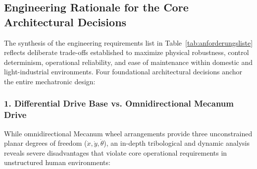 \subsection{Engineering Rationale for the Core Architectural Decisions}
\label{subsec:engineering_rationale}
The synthesis of the engineering requirements list in Table~\ref{tab:anforderungsliste} reflects deliberate trade-offs established to maximize physical robustness, control determinism, operational reliability, and ease of maintenance within domestic and light-industrial environments. Four foundational architectural decisions anchor the entire mechatronic design:

\subsubsection{1. Differential Drive Base vs. Omnidirectional Mecanum Drive}
While omnidirectional Mecanum wheel arrangements provide three unconstrained planar degrees of freedom ($\dot{x}, \dot{y}, \dot{\theta}$), an in-depth tribological and dynamic analysis reveals severe disadvantages that violate core operational requirements in unstructured human environments:
